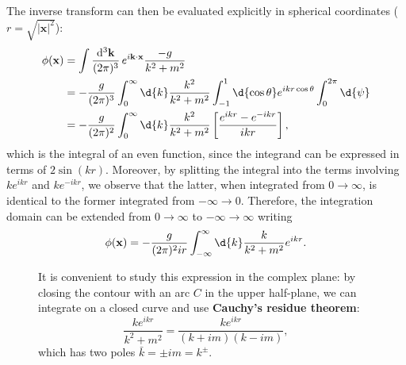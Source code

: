 The inverse transform can then be evaluated explicitly in spherical coordinates (\(r = \sqrt{|\mathbf{x}|^2}\)):
\[
    \begin{aligned}
        \phi(\mathbf{x}) & = \int \frac{\mathrm{d}^3 \mathbf{k}}{(2\pi)^3}\, e^{i \mathbf{k} \cdot \mathbf{x}} \frac{-g}{k^2 + m^2}                                   \\
                         & = -\frac{g}{(2\pi)^3} \int_0^{\infty} \d{k} \frac{k^2}{k^2 + m^2} \int_{-1}^{1} \d{\cos \theta} e^{ikr \cos \theta} \int_0^{2\pi} \d{\psi} \\
                         & = -\frac{g}{(2\pi)^2} \int_0^{\infty} \d{k} \frac{k^2}{k^2 + m^2} \left[ \frac{e^{ikr} - e^{-ikr}}{ikr} \right],
    \end{aligned}
\]
which is the integral of an even function, since the integrand can be expressed in terms of \(2 \sin(kr)\). Moreover, by splitting the integral into the terms involving \(k e^{ikr}\) and \(k e^{-ikr}\), we observe that the latter, when integrated from \(0 \to \infty\), is identical to the former integrated from \(-\infty \to 0\). Therefore, the integration domain can be extended from \(0 \to \infty\) to \(-\infty \to \infty\) writing
\[
    \phi(\mathbf{x}) = -\frac{g}{(2\pi)^2 ir} \int_{-\infty}^{\infty} \d{k} \frac{k}{k^2 + m^2}e^{ikr}.
\]

\begin{figure}[H]
    \begin{minipage}{0.5\textwidth}
        It is convenient to study this expression in the complex plane: by closing the contour with an arc \(C\) in the upper half-plane, we can integrate on a closed curve and use \textbf{Cauchy’s residue theorem}:
        \[
            \frac{ke^{ikr}}{k^2 + m^2} = \frac{ke^{ikr}}{(k+im)(k-im)},
        \]
        which has two poles \(\bar{k} = \pm im = k^{\pm}\).
    \end{minipage}
    \hfill
    \begin{minipage}{0.45\textwidth}
        \centering
    \end{minipage}
\end{figure}

